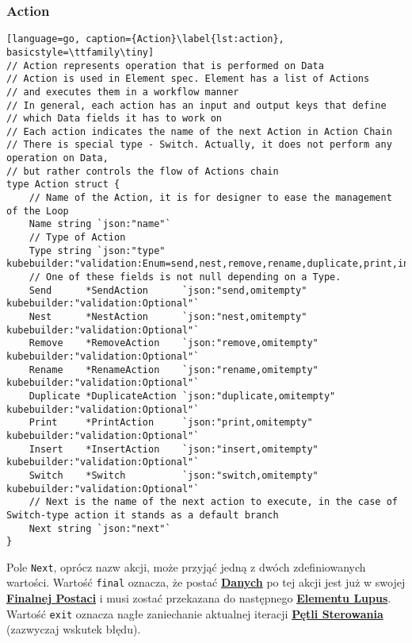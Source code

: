 \subsubsection{Action}
\begin{lstlisting}[language=go, caption={Action}\label{lst:action}, basicstyle=\ttfamily\tiny]
// Action represents operation that is performed on Data
// Action is used in Element spec. Element has a list of Actions 
// and executes them in a workflow manner
// In general, each action has an input and output keys that define 
// which Data fields it has to work on
// Each action indicates the name of the next Action in Action Chain
// There is special type - Switch. Actually, it does not perform any operation on Data, 
// but rather controls the flow of Actions chain
type Action struct {
	// Name of the Action, it is for designer to ease the management of the Loop
	Name string `json:"name"`
	// Type of Action
	Type string `json:"type" kubebuilder:"validation:Enum=send,nest,remove,rename,duplicate,print,insert,switch"`
	// One of these fields is not null depending on a Type.
	Send      *SendAction      `json:"send,omitempty" kubebuilder:"validation:Optional"`
	Nest      *NestAction      `json:"nest,omitempty" kubebuilder:"validation:Optional"`
	Remove    *RemoveAction    `json:"remove,omitempty" kubebuilder:"validation:Optional"`
	Rename    *RenameAction    `json:"rename,omitempty" kubebuilder:"validation:Optional"`
	Duplicate *DuplicateAction `json:"duplicate,omitempty" kubebuilder:"validation:Optional"`
	Print     *PrintAction     `json:"print,omitempty" kubebuilder:"validation:Optional"`
	Insert    *InsertAction    `json:"insert,omitempty" kubebuilder:"validation:Optional"`
	Switch    *Switch          `json:"switch,omitempty" kubebuilder:"validation:Optional"`
	// Next is the name of the next action to execute, in the case of Switch-type action it stands as a default branch
	Next string `json:"next"`
}
\end{lstlisting}

Pole \texttt{Next}, oprócz nazw akcji, może przyjąć jedną z dwóch zdefiniowanych wartości. Wartość \texttt{final} oznacza, że postać \hyperlink{def:dane}{\textbf{Danych}} po tej akcji jest już w swojej \hyperlink{def:finalne-dane}{\textbf{Finalnej Postaci}} i musi zostać przekazana do następnego \hyperlink{def:element-lupus}{\textbf{Elementu Lupus}}. Wartość \texttt{exit} oznacza nagłe zaniechanie aktualnej iteracji \hyperlink{def:zamknieta-petla-sterowania}{\textbf{Pętli Sterowania}} (zazwyczaj wskutek błędu).

